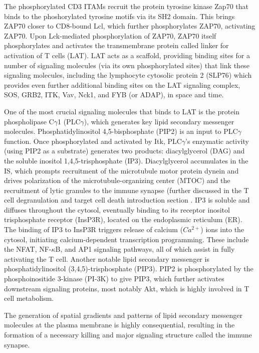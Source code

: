 The phosphorylated CD3 ITAMs recruit the protein tyrosine kinase Zap70 that binds to the phoshorylated tyrosine motifs via its SH2 domain.  This brings ZAP70 closer to CD8-bound Lcl, which further phosphorylates ZAP70, activating ZAP70. Upon Lck-mediated phosphorylation of ZAP70,  ZAP70 itself phosphorylates and activates the transmembrane protein called linker for activation of T cells (LAT). LAT acts as a scaffold, providing binding sites for a number of signaling molecules (via its own phosphorylated sites) that link these signaling molecules, including the lymphocyte cytosolic protein 2 (SLP76) which provides even further additional binding sites on the LAT signaling complex, SOS,  GRB2, ITK, Vav, Nck1, and FYB (or ADAP), in space and time.  

One of the most crucial signaling molecules that binds to LAT is the protein phospholipase C$\gamma$1 (PLC$\gamma$), which generates key lipid secondary messenger molecules. Phosphatidylinositol 4,5-bisphosphate (PIP2) is an input to PLC$\gamma$ function. Once phosphorylated and activated by Itk, PLC$\gamma$'s enzymatic activity (using PIP2 as a substrate) generates two products: diacylglycerol (DAG) and the soluble inositol 1,4,5-trisphosphate (IP3). Diacylglycerol accumulates in the IS, which prompts recruitment of the microtubule motor protein dynein and drives polarization of the microtubule-organizing center (MTOC) \cite{Quann2009} and the recruitment of lytic granules to the immune synapse (further discussed in the T cell degranulation and target cell death introduction section \cite{Stinchcombe2006}. IP3 is soluble and diffuses throughout the cytosol, eventually binding to its receptor inositol trisphosphate receptor (InsP3R), located on the endoplasmic reticulum (ER). The binding of IP3 to InsP3R triggers release of calcium ($Ca^{2+}$) ions into the cytosol, initiating calcium-dependent transcription programming. These include the NFAT, NF-$\kappa$B, and AP1 signaling pathways, all of which assist in fully activating the T cell. Another notable lipid secondary messenger is phosphatidylinositol (3,4,5)-trisphosphate (PIP3). PIP2 is phosphorylated by the phosphoinositide 3-kinase (PI-3K) to give PIP3, which further activates downstream signaling proteins, most notably Akt, which is highly involved in T cell metabolism.

The generation of spatial gradients and patterns of lipid secondary messenger molecules at the plasma membrane is highly consequential, resulting in the formation of a necessary killing and major signaling structure called the immune synapse. 

